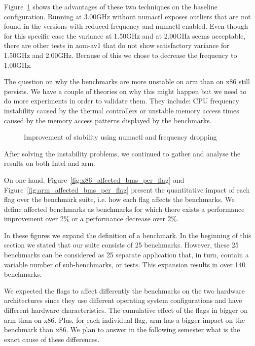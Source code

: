 Figure~\ref{fig:EncoderModeSpeed11RealtimeInputBosphorus4K} shows the advantages
of these two techniques on the baseline configuration. Running at 3.00GHz
without numactl exposes outliers that are not found in the versions with reduced
frequency and numactl enabled. Even though for this specific case the variance
at 1.50GHz and at 2.00GHz seems acceptable, there are other tests in aom-av1
that do not show satisfactory variance for 1.50GHz and 2.00GHz. Because of this
we chose to decrease the frequency to 1.00GHz.

The question on why the benchmarks are more unstable on arm than on x86 still
persists. We have a couple of theories on why this might happen but we need to
do more experiments in order to validate them. They include: CPU frequency
instability caused by the thermal controllers or unstable memory access times
caused by the memory access patterns displayed by the benchmarks. 

\begin{figure}[H]
  \centering
  
  \caption{Improvement of stability using numactl and frequency dropping}
  \label{fig:EncoderModeSpeed11RealtimeInputBosphorus4K}
\end{figure}

After solving the instability problems, we continued to gather and analyse the
results on both Intel and arm.

On one hand, Figure~\ref{fig:x86_affected_bms_per_flag} and
Figure~\ref{fig:arm_affected_bms_per_flag} present the quantitative impact of
each flag over the benchmark suite, i.e. how each flag affects the benchmarks.
We define affected benchmarks as benchmarks for which there exists a performance
improvement over 2\% or a performance decrease over 2\%.

In these figures we expand the definition of a benchmark. In the beginning of
this section we stated that our suite consists of 25 benchmarks. However, these
25 benchmarks can be considered as 25 separate application that, in turn,
contain a variable number of sub-benchmarks, or tests. This expansion results in
over 140 benchmarks.

We expected the flags to affect differently the benchmarks on the two hardware
architectures since they use different operating system configurations and have
different hardware characteristics. The cumulative effect of the flags in bigger
on arm than on x86. Plus, for each individual flag, arm has a bigger impact on
the benchmark than x86. We plan to answer in the following semester what is the
exact cause of these differences.

